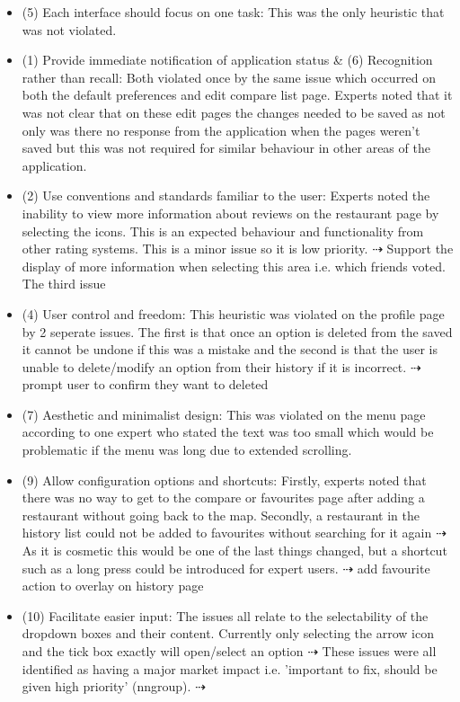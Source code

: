 \documentclass[a4 paper, 12pt]{article}
\begin{document}
\begin{itemize}
    \item (5) Each interface should focus on one task: This was the only heuristic that was not violated.
    \item (1) Provide immediate notification of application status \& (6) Recognition rather than recall: Both violated once by the same issue which occurred on both the default preferences and edit compare list page. Experts noted that it was not clear that on these edit pages the changes needed to be saved as not only was there no response from the application when the pages weren't saved but this was not required for similar behaviour in other areas of the application. 
    \item (2) Use conventions and standards familiar to the user: Experts noted the inability to view more information about reviews on the restaurant page by selecting the icons. This is an expected behaviour and functionality from other rating systems. This is a minor issue so it is low priority. $\dashrightarrow$ Support the display of more information when selecting this area i.e. which friends voted. The third issue 
    \item (4) User control and freedom: This heuristic was violated on the profile page by 2 seperate issues. The first is that once an option is deleted from the saved it cannot be undone if this was a mistake and the second is that the user is unable to delete/modify an option from their history if it is incorrect. $\dashrightarrow$ prompt user to confirm they want to deleted
    \item (7) Aesthetic and minimalist design: This was violated on the menu page according to one expert who stated the text was too small which would be problematic if the menu was long due to extended scrolling. 
    \item (9) Allow configuration options and shortcuts: Firstly, experts noted that there was no way to get to the compare or favourites page after adding a restaurant without going back to the map. Secondly, a restaurant in the history list could not be added to favourites without searching for it again $\dashrightarrow$ As it is cosmetic this would be one of the last things changed, but a shortcut such as a long press could be introduced for expert users. $\dashrightarrow$ add favourite action to overlay on history page
    \item (10) Facilitate easier input: The issues all relate to the selectability of the dropdown boxes and their content. Currently only selecting the arrow icon and the tick box exactly will open/select an option $\dashrightarrow$  These issues were all identified as having a major market impact i.e. 'important to fix, should be given high priority' (nngroup).  $\dashrightarrow$

\end{itemize}
\end{document}
